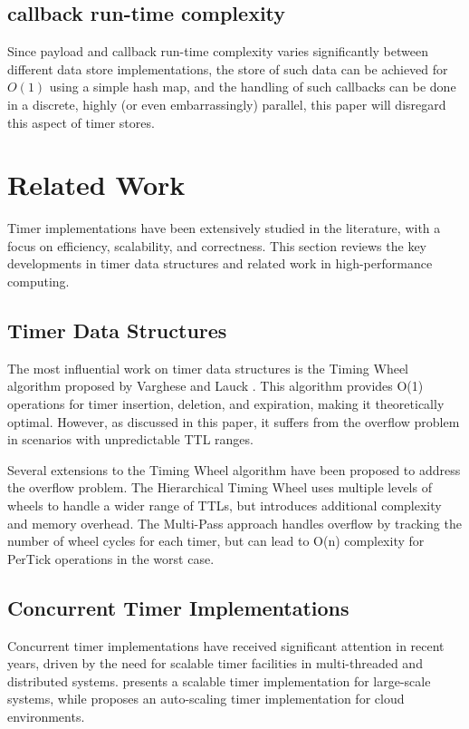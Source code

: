 \documentclass[conference]{IEEEtran}
\begin{document}
\subsection{callback run-time complexity}

Since payload and callback run-time complexity varies significantly between different data store implementations, the store of such data can be achieved for $ O(1) $ using a simple hash map, and the handling of such callbacks can be done in a discrete, highly (or even embarrassingly) parallel, this paper will disregard this aspect of timer stores.

\section{Related Work}
Timer implementations have been extensively studied in the literature, with a focus on efficiency, scalability, and correctness. This section reviews the key developments in timer data structures and related work in high-performance computing.

\subsection{Timer Data Structures}
The most influential work on timer data structures is the Timing Wheel algorithm proposed by Varghese and Lauck \cite{TW87}. This algorithm provides O(1) operations for timer insertion, deletion, and expiration, making it theoretically optimal. However, as discussed in this paper, it suffers from the overflow problem in scenarios with unpredictable TTL ranges.

Several extensions to the Timing Wheel algorithm have been proposed to address the overflow problem. The Hierarchical Timing Wheel \cite{TW} uses multiple levels of wheels to handle a wider range of TTLs, but introduces additional complexity and memory overhead. The Multi-Pass approach \cite{CQ} handles overflow by tracking the number of wheel cycles for each timer, but can lead to O(n) complexity for PerTick operations in the worst case.


\subsection{Concurrent Timer Implementations}
Concurrent timer implementations have received significant attention in recent years, driven by the need for scalable timer facilities in multi-threaded and distributed systems. \cite{largescale} presents a scalable timer implementation for large-scale systems, while \cite{autoscale} proposes an auto-scaling timer implementation for cloud environments.
\end{document}
